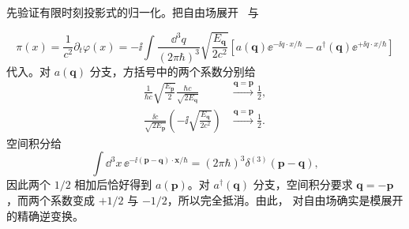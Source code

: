 \begin{derivation}
先验证有限时刻投影式的归一化。把自由场展开~ 与

\begin{equation*}
 \pi(x)=\frac{1}{c^2}\partial_t\varphi(x)
 =-\ii\int\frac{\dd^3 q}{(2\pi\hbar)^3}
 \sqrt{\frac{E_{\mathbf q}}{2c^2}}
 \left[
 a(\mathbf q)\ee^{-\ii q\cdot x/\hbar}
 -a^\dagger(\mathbf q)\ee^{+\ii q\cdot x/\hbar}
 \right]
\end{equation*}
代入。对 $a(\mathbf q)$ 分支，方括号中的两个系数分别给
\begin{align*}
 \frac{1}{\hbar c}\sqrt{\frac{E_{\mathbf p}}{2}}
 \frac{\hbar c}{\sqrt{2E_{\mathbf q}}}
 &\xrightarrow{\mathbf q=\mathbf p}\frac12,\\
 \frac{\ii c}{\sqrt{2E_{\mathbf p}}}
 \left(-\ii\sqrt{\frac{E_{\mathbf q}}{2c^2}}\right)
 &\xrightarrow{\mathbf q=\mathbf p}\frac12.
\end{align*}
空间积分给
\begin{equation*}
 \int\dd^3 x\,
 \ee^{-\ii(\mathbf p-\mathbf q)\cdot\mathbf x/\hbar}
 =(2\pi\hbar)^3\delta^{(3)}(\mathbf p-\mathbf q),
\end{equation*}
因此两个 $1/2$ 相加后恰好得到 $a(\mathbf p)$。对 $a^\dagger(\mathbf q)$ 分支，空间积分要求 $\mathbf q=-\mathbf p$，而两个系数变成 $+1/2$ 与 $-1/2$，所以完全抵消。由此， 对自由场确实是模展开的精确逆变换。


\end{derivation}
